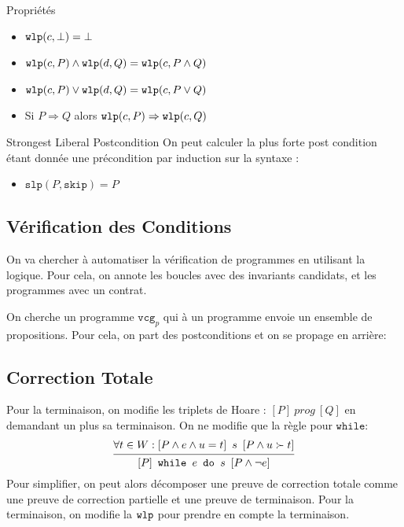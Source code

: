 \documentclass{cours}
\begin{document}
\begin{propositionfr}{Propriétés}{}
	\begin{itemize}
		\item $\texttt{wlp}(c, \bot) = \bot$
		\item $\texttt{wlp}(c, P) \land \texttt{wlp}(d, Q) = \texttt{wlp}(c, P \land Q)$
		\item $\texttt{wlp}(c, P) \lor \texttt{wlp}(d, Q) = \texttt{wlp}(c, P \lor Q)$
		\item Si $P \Rightarrow Q$ alors $\texttt{wlp}(c, P) \Rightarrow \texttt{wlp}(c, Q)$
	\end{itemize}

\end{propositionfr}
\newcommand{\slp}{\texttt{slp}}
\begin{définition}
{Strongest Liberal Postcondition}{}
On peut calculer la plus forte post condition étant donnée une précondition par induction sur la syntaxe :
\begin{itemize}
	\item $\slp(P, \texttt{skip}) = P$
\end{itemize}
\end{définition}

\subsection{Vérification des Conditions}
On va chercher à automatiser la vérification de programmes en utilisant la logique.
Pour cela, on annote les boucles avec des invariants candidats, et les programmes avec un contrat.

\newcommand{\vcg}{\texttt{vcg}}
On cherche un programme $\vcg_{p}$ qui à un programme envoie un ensemble de propositions. Pour cela, on part des postconditions et on se propage en arrière:



\subsection{Correction Totale}
\newcommand{\boar}[3]{\left[#1\right] \ #2 \ \left[#3\right]}
Pour la terminaison, on modifie les triplets de Hoare : $\boar{P}{prog}{Q}$ en demandant un plus sa terminaison.
On ne modifie que la règle pour $\texttt{while}$:
\begin{equation*}
	\begin{prooftree}
		\hypo{\forall t \in W: \boar{P \land e \land u = t}{s}{P \land u \succ t}}
		\infer1{\boar{P}{\texttt{while } e \texttt{ do } s}{P \land \lnot e}}
	\end{prooftree}
\end{equation*}
Pour simplifier, on peut alors décomposer une preuve de correction totale comme une preuve de correction partielle et une preuve de terminaison.
Pour la terminaison, on modifie la $\texttt{wlp}$ pour prendre en compte la terminaison.
\end{document}
